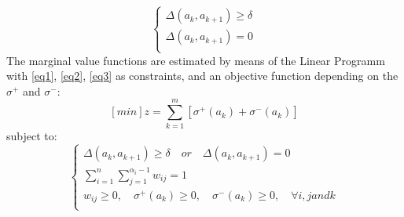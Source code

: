 \documentclass{report}
\begin{document}
\begin{equation}\label{eq3}
\begin{cases}
\Delta (a_k, a_{k+1} ) \geq \delta\\
\Delta (a_k, a_{k+1} ) = 0 \\
\end{cases}
\end{equation}
The marginal value functions are estimated by means of the Linear Programm with \eqref{eq1}, \eqref{eq2}, \eqref{eq3} as constraints, and an objective function depending on the $ \sigma^{+}$ and $\sigma^{-} $: 
$$ [min]z = \sum_{k=1}^{m} [ \sigma ^{+} (a_k) + \sigma ^{-} (a_k)] $$
subject to: 
\begin{equation}\label{eq5}
\begin{cases}
\Delta (a_k, a_{k+1} ) \geq \delta \quad or \quad \Delta (a_k, a_{k+1} ) = 0 \\
\sum_{i=1}^{n} \sum_{j=1}^{\alpha_i -1} w_{ij} = 1\\
w_{ij} \geq 0, \quad \sigma^{+}(a_k) \geq 0, \quad \sigma^{-}(a_k) \geq 0, \quad \forall i, j and k\\
\end{cases}
\end{equation}
\end{document}
